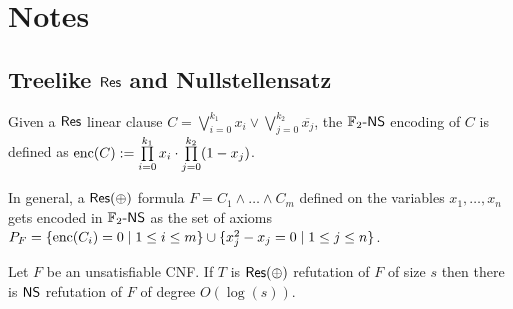 

\chapter{Notes} \label{chap:notes}

\section{Treelike $\mathsf{Res}$ and Nullstellensatz}

\begin{definition}
    Given a $\mathsf{Res}$ linear clause $C = \bigvee\limits_{i = 0}^{k_1} x_i \lor  \bigvee\limits_{j = 0}^{k_2} \overline{x_j}$, the $\mathbb{F}_2\text{-}\mathsf{NS}$ encoding of $C$ is defined as $\mathrm{enc}(C) := \prod\limits_{i = 0}^{k_1} x_i \cdot \prod\limits_{j = 0}^{k_2} (1-x_j)$.
    
    In general, a $\mathsf{Res(\oplus)}$ formula $F = C_1 \land \ldots \land C_m$ defined on the variables $x_1, \ldots, x_n$ gets encoded in $\mathbb{F}_2\text{-}\mathsf{NS}$ as the set of axioms $P_F = \{\mathrm{enc}(C_i) = 0 \mid 1 \leq i \leq m\} \cup \{x_j^2-x_j = 0 \mid 1 \leq j \leq n\}$.
\end{definition}

\begin{theorem}
    Let $F$ be an unsatisfiable CNF. If $T$ is $\mathsf{Res(\oplus)}$ refutation of $F$ of size $s$ then there is $\mathsf{NS}$ refutation of $F$ of degree $O(\log(s))$.
\end{theorem}


